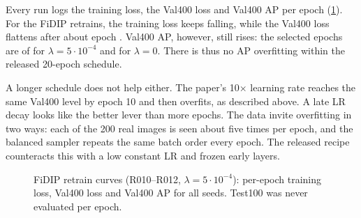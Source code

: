Every run logs the training loss, the Val400 loss and Val400 AP per epoch (\cref{fig:curves}).
For the FiDIP retrains, the training loss keeps falling, while the Val400 loss flattens after about epoch .
Val400 AP, however, still rises: the selected epochs are  of  for $\lambda=5{\cdot}10^{-4}$ and  for $\lambda=0$. There is thus no AP overfitting within the released 20-epoch schedule.

A longer schedule does not help either. The paper's 10$\times$ learning rate reaches the same Val400 level by epoch 10 and then overfits, as described above. A late LR decay looks like the better lever than more epochs.
The data invite overfitting in two ways: each of the 200 real images is seen about five times per epoch, and the balanced sampler repeats the same batch order every epoch. The released recipe counteracts this with a low constant LR and frozen early layers.

\begin{figure}[t]
  \centering
  \caption{FiDIP retrain curves (R010--R012, $\lambda=5{\cdot}10^{-4}$): per-epoch training loss, Val400 loss and Val400 AP for all seeds. Test100 was never evaluated per epoch.}
  \label{fig:curves}
\end{figure}
